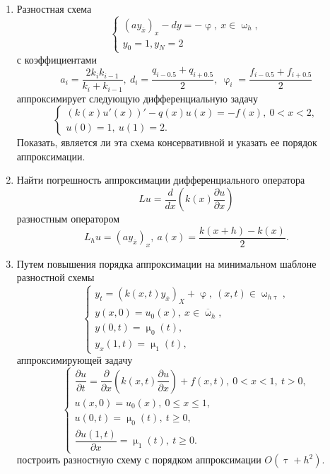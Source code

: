 \documentclass[a4paper, 12pt]{report}
\numberwithin{equation}{section}
\newcommand{\ol}{\overline}
\renewcommand{\leq}{\leqslant}
\renewcommand{\geq}{\geqslant}
\renewcommand{\varphi}{\upvarphi}
\renewcommand{\tau}{\uptau}
\renewcommand{\mu}{\upmu}
\renewcommand{\omega}{\upomega}
\renewcommand{\d}{\partial}
\begin{document}
\begin{enumerate}
		\item Разностная схема 
		$$\begin{cases}
			(a y_{\ol x})_x - dy = - \varphi,\ x \in \omega_h,\\
			y_0 = 1, y_N = 2
		\end{cases}$$
		с коэффициентами
		$$a_i = \dfrac{2 k_i k_{i-1}}{k_i + k_{i-1}},\ d_i = \dfrac{q_{i - 0.5} + q_{i + 0.5}}{2},\ \varphi_i = \dfrac{f_{i-0.5}+f_{i+0.5}}{2}$$
		аппроксимирует следующую дифференциальную задачу
		$$\begin{cases}
			(k(x)u'(x))' - q(x)u(x) = - f(x),\ 0 < x< 2,\\
			u(0) = 1,\ u(1) = 2.
		\end{cases}$$
		Показать, является ли эта схема консервативной и указать ее порядок аппроксимации.
		\item 
		Найти погрешность аппроксимации дифференциального оператора $$Lu = \dfrac{d }{dx}\left(k(x)\dfrac{\d u}{\d x}\right)$$ разностным оператором $$L_hu = (a y_{\ol x})_x,\ a(x) = \dfrac{k(x+h)-k(x)}{2}.$$
		\item Путем повышения порядка аппроксимации на минимальном шаблоне разностной схемы
		$$\begin{cases} 
			y_t = (k(x,t)y_{\ol x})_X + \varphi,\ (x,t) \in \omega_{h \tau},\\
			y(x,0) = u_0(x),\ x \in \ol \omega_h,\\
			y(0,t) = \mu_0(t),\\
			y_x(1,t) = \mu_1(t),
		\end{cases}$$
		аппроксимирующей задачу
		$$\begin{cases}
			\dfrac{\d u}{\d t} = \dfrac{\d  }{\d x }\left(k(x,t) \dfrac{\d u}{\d x}\right) + f(x,t),\ 0<x<1,\ t>0,\\
			u(x,0) = u_0(x),\ 0 \leq x \leq 1,\\
			u (0,t) = \mu_0(t),\ t \geq 0,\\
			\dfrac{\d u (1,t)}{\d x} = \mu_1(t),\ t \geq 0.
		\end{cases}$$ 
		построить разностную схему с порядком аппроксимации $O(\tau + h^2)$.
	\end{enumerate}
	
\end{document}

